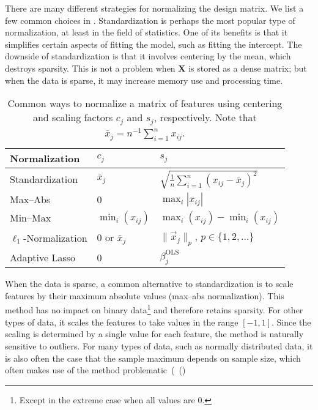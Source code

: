 There are many different strategies for normalizing the design matrix. We list a few common
choices in . Standardization is perhaps the most popular type
of normalization, at least in the field of statistics. One of its benefits is that it
simplifies certain aspects of fitting the model, such as fitting the intercept. The
downside of standardization is that it involves centering by the mean, which destroys
sparsity. This is not a problem when \(\bm{X}\) is stored as a dense matrix; but when the
data is sparse, it may increase memory use and processing time.

\begin{table}[hbt]
  \centering
  \caption{
    Common ways to normalize a matrix of features using centering and scaling
    factors \(c_j\) and \(s_j\), respectively. Note that \(\bar{x}_j =
    n^{-1}\sum_{i=1}^n x_{ij}\).
  }
  \label{tab:normalization-types}
  \vskip 0.15in
  \small
  \begin{tabular}{lll}
    \toprule
    Normalization            & \(c_{j}\)          & \(s_j\)                                                   \\
    \midrule
    Standardization          & \(\bar{x}_j\)      & \(\sqrt{\frac{1}{n}\sum_{i=1}^n (x_{ij} - \bar{x}_j)^2}\) \\
    \addlinespace
    Max--Abs                 & 0                  & \(\max_i|x_{ij}|\)                                        \\
    \addlinespace
    Min--Max                 & \(\min_i(x_{ij})\) & \(\max_i(x_{ij}) - \min_i(x_{ij})\)                       \\
    \addlinespace
    \(\ell_1\)-Normalization & 0 or \(\bar{x}_j\) & \(\lVert \vec{x}_j\rVert_p\), \(p \in \{1,2,\dots\}\)     \\
    \addlinespace
    Adaptive Lasso           & 0                  & \(\beta_j^\text{OLS}\)                                    \\
    \bottomrule
  \end{tabular}
\end{table}

When the data is sparse, a common alternative to standardization is to scale features by
their maximum absolute values (max--abs normalization). This method has no impact on binary
data\footnote{Except in the extreme case when all values are 0.} and therefore retains
sparsity. For other types of data, it scales the features to take values in the range
\([-1, 1]\). Since the scaling is determined by a single value for each feature, the method
is naturally sensitive to outliers. For many types of data, such as normally distributed
data, it is also often the case that the sample maximum depends on sample size, which often
makes use of the method problematic~(~()

